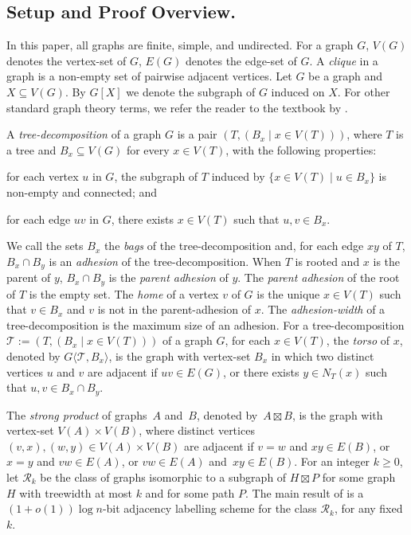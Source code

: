 \documentclass[twoside,leqno]{article}
\renewcommand{\geq}{\geqslant}
\newcommand{\defin}[1]{\emph{\textcolor{brightmaroon}{#1}}}
\newcommand{\torso}[2]{{#1}\langle{#2}\rangle}
\begin{document}
\subsection{Setup and Proof Overview.}
\label{KeyTools}

In this paper, all graphs are finite, simple, and undirected.  For a graph $G$, \defin{$V(G)$} denotes the vertex-set of $G$, \defin{$E(G)$} denotes the edge-set of $G$.  A \defin{clique} in a graph is a non-empty set of pairwise adjacent vertices.   Let $G$ be a graph and $X\subseteq V(G)$. By $G[X]$ we denote the subgraph of $G$ induced on $X$. For other standard graph theory terms, we refer the reader to the textbook by \citet{diestel:graph}.

A \defin{tree-decomposition} of a graph $G$ is a pair $(T,(B_x \mid x \in V(T)))$, where $T$ is a tree and $B_x \subseteq V(G)$ for every $x \in V(T)$, with the following properties:
\begin{enumerate*}[label=(\alph*)]
  \item for each vertex $u$ in $G$, the subgraph of $T$ induced by $\{x \in V(T) \mid u \in B_x\}$ is non-empty and connected; and
  \item for each edge $uv$ in $G$, there exists $x\in V(T)$ such that $u,v\in B_x$.
\end{enumerate*}
We call the sets $B_x$ the \defin{bags} of the tree-decomposition and, for each edge $xy$ of $T$, $B_x\cap B_y$ is an \defin{adhesion} of the tree-decomposition.  When $T$ is rooted and $x$ is the parent of $y$, $B_x\cap B_y$ is the \defin{parent adhesion} of $y$. The \defin{parent adhesion} of the root of $T$ is the empty set. The \defin{home} of a vertex $v$ of $G$ is the unique $x\in V(T)$ such that $v\in B_x$ and $v$ is not in the parent-adhesion of $x$. The \defin{adhesion-width} of a tree-decomposition is the maximum size of an adhesion. For a tree-decomposition $\mathcal{T}:=(T,(B_x \mid x\in V(T)))$ of a graph $G$, for each  $x\in V(T)$, the \defin{torso} of $x$, denoted by \defin{$\torso{G}{\mathcal{T},B_x}$}, is the graph with vertex-set $B_x$ in which two distinct vertices $u$ and $v$ are adjacent if $uv \in E(G)$, or there exists $y \in N_T(x)$  such that $u,v \in B_x \cap B_y$.

The \defin{strong product} of graphs~$A$ and~$B$, denoted by~${A \boxtimes B}$, is the graph with vertex-set ${V(A) \times V(B)}$, where distinct vertices ${(v,x),(w,y) \in V(A) \times V(B)}$ are adjacent if
${v=w}$ and ${xy \in E(B)}$, or
${x=y}$ and ${vw \in E(A)}$, or
${vw \in E(A)}$ and~${xy \in E(B)}$.
For an integer $k\geq 0$, let \defin{$\mathcal{R}_{k}$} be the class of graphs isomorphic to a subgraph of $H\boxtimes P$ for some graph $H$ with treewidth at most $k$ and for some path $P$.  The main result of \citet{dujmovic.esperet.ea:adjacency} is a $(1+o(1))\log n$-bit adjacency labelling scheme for the class $\mathcal{R}_k$, for any fixed $k$.
\end{document}
